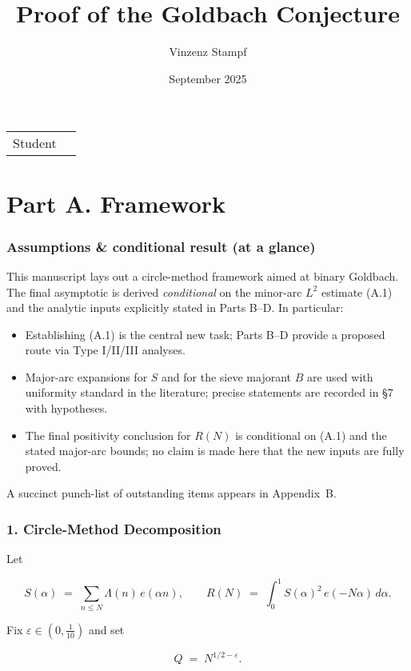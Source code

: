 \documentclass[11pt]{article}
\title{Proof of the Goldbach Conjecture}
\author{Vinzenz Stampf}
\date{September 2025}
\makeatletter
\theoremstyle{definition}
\theoremstyle{remark}
\providecommand{\theauthor}{\@author}
\makeatother
\begin{document}
\maketitle

\noindent\begin{tabular}{@{}ll}
    Student & \theauthor\\
\end{tabular}

\part*{Part A. Framework}

\section*{Assumptions \& conditional result (at a glance)}

This manuscript lays out a circle-method framework aimed at binary Goldbach. The final asymptotic is derived \emph{conditional} on the minor-arc $L^2$ estimate (A.1) and the analytic inputs explicitly stated in Parts B–D. In particular:

\begin{itemize}
  \item Establishing (A.1) is the central new task; Parts B–D provide a proposed route via Type I/II/III analyses.
  \item Major-arc expansions for $S$ and for the sieve majorant $B$ are used with uniformity standard in the literature; precise statements are recorded in §7 with hypotheses.
  \item The final positivity conclusion for $R(N)$ is conditional on (A.1) and the stated major-arc bounds; no claim is made here that the new inputs are fully proved.
\end{itemize}

A succinct punch-list of outstanding items appears in Appendix~B.

\section*{1. Circle-Method Decomposition}

Let

$$
S(\alpha)\;=\;\sum_{n\le N}\Lambda(n)\,e(\alpha n),\qquad
R(N)\;=\;\int_{0}^{1} S(\alpha)^2\,e(-N\alpha)\,d\alpha .
$$

Fix $\varepsilon\in (0,\tfrac1{10})$ and set

$$
Q \;=\; N^{1/2-\varepsilon}.
$$
\end{document}
